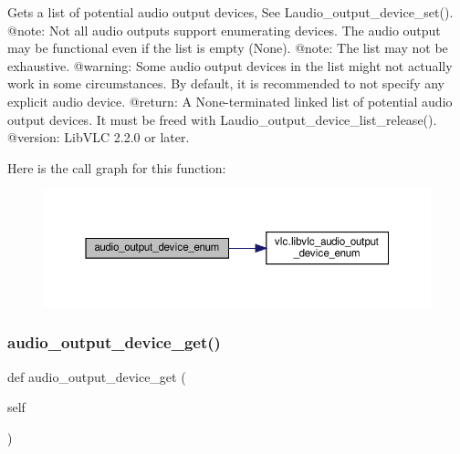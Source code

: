 \begin{DoxyVerb}Gets a list of potential audio output devices,
See L{audio_output_device_set}().
@note: Not all audio outputs support enumerating devices.
The audio output may be functional even if the list is empty (None).
@note: The list may not be exhaustive.
@warning: Some audio output devices in the list might not actually work in
some circumstances. By default, it is recommended to not specify any
explicit audio device.
@return: A None-terminated linked list of potential audio output devices. It must be freed with L{audio_output_device_list_release}().
@version: LibVLC 2.2.0 or later.
\end{DoxyVerb}
 Here is the call graph for this function\+:
\nopagebreak
\begin{figure}[H]
\begin{center}
\leavevmode
\includegraphics[width=350pt]{classvlc_1_1_media_player_a8f936fa19d272b0c7bcf4916a0ddf095_cgraph}
\end{center}
\end{figure}
\mbox{\label{classvlc_1_1_media_player_a8b9d8ed2e22b0f297547d50c9a484270}} 
\subsubsection{\texorpdfstring{audio\+\_\+output\+\_\+device\+\_\+get()}{audio\_output\_device\_get()}}
{\footnotesize\ttfamily def audio\+\_\+output\+\_\+device\+\_\+get (\begin{DoxyParamCaption}\item[{}]{self }\end{DoxyParamCaption})}

